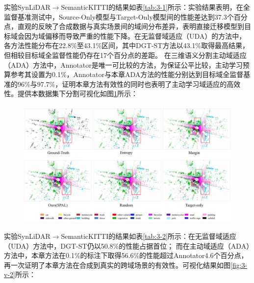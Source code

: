 实验SynLiDAR\(\to\)SemanticKITTI的结果如表\ref{tab:3-1}所示：实验结果表明，在全监督基准测试中，Source-Only模型与Target-Only模型间的性能差达到37.3个百分点，直观的反映了合成数据与真实场景间的域间分布差异，表明直接迁移模型到目标域会因为域偏移而导致严重的性能下降。在无监督域适应（UDA）的方法中，各方法性能分布在22.8\%至43.1\%区间，其中DGT-ST方法以43.1\%取得最高结果，但相较目标域全监督性能仍存在17个百分点的差距。
在三维语义分割主动域适应（ADA）方法中，Annotator是唯一可比较的方法，为保证公平比较，主动学习预算参考其设置为0.1\%，Annotator与本章ADA方法的性能分别达到目标域全监督基准的96\%与97.7\%，证明本章方法有效性的同时也表明了主动学习域适应的高效性。提供本数据集下分割可视化如图\ref{fig:3-v-1}所示：
\vspace{-0.1cm}
\begin{figure}[H]
    \centering
    \includegraphics[width = \textwidth]{ljx/figure/3_vision_s2k1.pdf}
    \label{fig:3-v-1}
\end{figure}
\vspace{-0.35cm}
\vspace{0.1cm}

实验SynLiDAR\(\to\)SemanticKITTI的结果如表\ref{tab:3-2}所示：在无监督域适应（UDA）方法中，DGT-ST仍以50.8\%的性能占据首位；
而在主动域适应（ADA）方法中，本章方法在0.1\%的标注下取得56.6\%的性能超过Annotator4.6个百分点，再一次证明了本章方法在合成到真实的跨域场景的有效性。可视化结果如图\ref{fig:3-v-2}所示：

